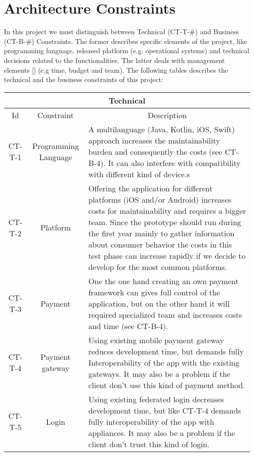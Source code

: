 \section{Architecture Constraints}

In this project we must distinguish between Technical (CT-T-\#) and Business (CT-B-\#) Constraints. The former describes specific elements
of the project, like programming language, released platform (e.g. operational systems) and technical decisions related to 
the functionalities. The latter deals with management elements [\cite{refonline:EFAD}] (e.g time, budget and team). The following
tables describes the technical and the business constraints of this project: 

\begin{table}[H]
    \begin{tabularx}{\textwidth}{|c|c|X|}
        \hline
        \multicolumn{3}{c}{\textbf{Technical}} \\
        \hline
        \toprule
        \multicolumn{1}{c}{Id} & \multicolumn{1}{c}{Constraint} & \multicolumn{1}{c}{Description} \\
        \midrule
        CT-T-1 & Programming Language & A multilanguage (Java, Kotlin, iOS, Swift) approach increases
        the maintainability burden and consequently the costs (see CT-B-4). It can also interfere with
        compatibility with different kind of device.s  \\ 
        CT-T-2 & Platform & Offering the application for different platforms (iOS and/or Android) increases
        costs for maintainability and requires a bigger team. Since the prototype should run during the
        first year mainly to gather information about consumer behavior the costs in this test phase can
        increase rapidly if we decide to develop for the most common platforms. \\ 
        CT-T-3 & Payment & One the one hand creating an own payment framework can gives full control of the application,
        but on the other hand it will required specialized team and increases costs and time (see CT-B-4). \\
        CT-T-4 & Payment gateway & Using existing \gls{mobile payment gateway} reduces development time, but demands
        fully Interoperability of the app with the existing gateways. It may also be a problem if the \gls{client}
        don't use this kind of payment method. \\
        CT-T-5 & Login & Using existing \gls{federated login} decreases development time, but like CT-T-4 demands
        fully interoperability of the app with appliances. It may also be a problem if the \gls{client}
        don't trust this kind of login. \\
        \bottomrule
    \end{tabularx}
\end{table}

